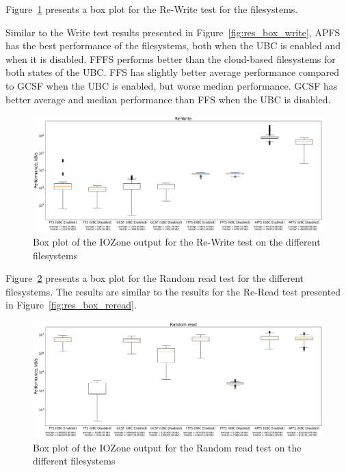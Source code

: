 \FloatBarrier

Figure~\ref{fig:res_box_rewrite} presents a box plot for the \mbox{Re-Write} test for the filesystems. 

Similar to the Write test results presented in Figure~\ref{fig:res_box_write}, \gls{APFS} has the best performance of the filesystems, both when the \gls{UBC} is enabled and when it is disabled. \gls{FFFS} performs better than the \mbox{cloud-based} filesystems for both states of the \gls{UBC}. \gls{FFS} has slightly better average performance compared to \gls{GCSF} when the \gls{UBC} is enabled, but worse median performance. \gls{GCSF} has better average and median performance than \gls{FFS} when the \gls{UBC} is disabled.

\begin{figure}[!ht]
	\label{fig:res_box_rewrite}
	\begin{center}
		\includegraphics[width=1.0\textwidth]{figures.nosync/benchmarking/Re-Write-boxplot.pdf}
	\end{center}
	\caption{Box plot of the IOZone output for the Re-Write test on the different filesystems}
\end{figure}

\FloatBarrier

Figure~\ref{fig:res_box_rndread} presents a box plot for the Random read test for the different filesystems. The results are similar to the results for the \mbox{Re-Read} test presented in Figure~\ref{fig:res_box_reread}.

\begin{figure}[!ht]
	\label{fig:res_box_rndread}
	\begin{center}
		\includegraphics[width=1.0\textwidth]{figures.nosync/benchmarking/Random read-boxplot.pdf}
	\end{center}
	\caption{Box plot of the IOZone output for the Random read test on the different filesystems}
\end{figure}

